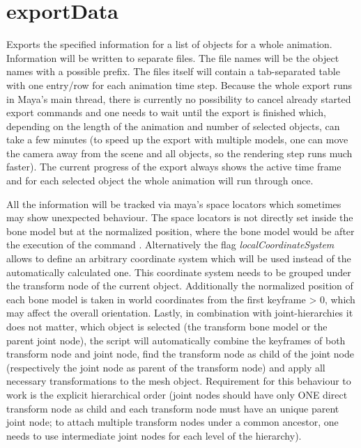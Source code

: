 \documentclass[letterpaper,10pt,english]{sphinxmanual}
\begin{document}
\section{exportData}
\label{pk_src.exportData:exportdata}\label{pk_src.exportData::doc}\label{pk_src.exportData:id1}
{\hyperref[index:commands]{}}
\label{pk_src.exportData:module-pk_src.exportData}
Exports the specified information for a list of objects for a whole animation. Information will be written to separate files. The file names will be the object names with a possible prefix. The files itself will contain a tab-separated table with one entry/row for each animation time step. Because the whole export runs in Maya's main thread, there is currently no possibility to cancel already started export commands and one needs to wait until the export is finished which, depending on the length of the animation and number of selected objects, can take a few minutes (to speed up the export with multiple models, one can move the camera away from the scene and all objects, so the rendering step runs much faster). The current progress of the export always shows the active time frame and for each selected object the whole animation will run through once.

All the information will be tracked via maya's space locators which sometimes may show unexpected behaviour. The space locators is not directly set inside the bone model but at the normalized position, where the bone model would be after the execution of the command {\hyperref[pk_src.normalize:normalize]{}}. Alternatively the flag \emph{localCoordinateSystem} allows to define an arbitrary coordinate system which will be used instead of the automatically calculated one. This coordinate system needs to be grouped under the transform node of the current object. Additionally the normalized position of each bone model is taken in world coordinates from the first keyframe \textgreater{} 0, which may affect the overall orientation. Lastly, in combination with joint-hierarchies it does not matter, which object is selected (the transform bone model or the parent joint node), the script will automatically combine the keyframes of both transform node and joint node, find the transform node as child of the joint node (respectively the joint node as parent of the transform node) and apply all necessary transformations to the mesh object. Requirement for this behaviour to work is the explicit hierarchical order (joint nodes should have only ONE direct transform node as child and each transform node must have an unique parent joint node; to attach multiple transform nodes under a common ancestor, one needs to use intermediate joint nodes for each level of the hierarchy).
\end{document}
